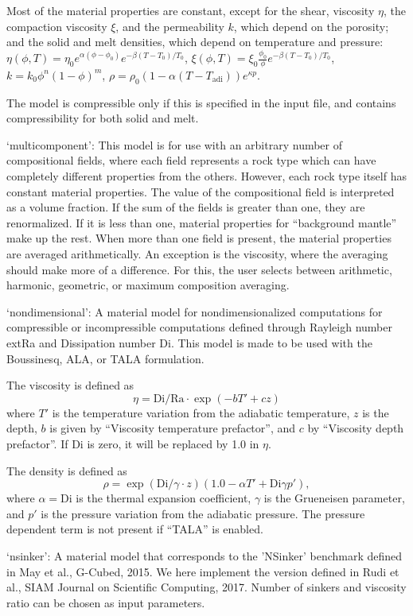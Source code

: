 \begin{itemize}
Most of the material properties are constant, except for the shear, viscosity $\eta$, the compaction viscosity $\xi$, and the permeability $k$, which depend on the porosity; and the solid and melt densities, which depend on temperature and pressure:
 $\eta(\phi,T) = \eta_0 e^{\alpha(\phi-\phi_0)} e^{-\beta(T-T_0)/T_0}$, $\xi(\phi,T) = \xi_0 \frac{\phi_0}{\phi} e^{-\beta(T-T_0)/T_0}$, $k=k_0 \phi^n (1-\phi)^m$, $\rho=\rho_0 (1 - \alpha (T - T_{\text{adi}})) e^{\kappa p}$.

The model is compressible only if this is specified in the input file, and contains compressibility for both solid and melt.

`multicomponent': This model is for use with an arbitrary number of compositional fields, where each field represents a rock type which can have completely different properties from the others. However, each rock type itself has constant material properties.  The value of the  compositional field is interpreted as a volume fraction. If the sum of the fields is greater than one, they are renormalized.  If it is less than one, material properties  for ``background mantle'' make up the rest. When more than one field is present, the material properties are averaged arithmetically.  An exception is the viscosity, where the averaging should make more of a difference.  For this, the user selects between arithmetic, harmonic, geometric, or maximum composition averaging.

`nondimensional': A material model for nondimensionalized computations for compressible or incompressible computations defined through Rayleigh number 	ext{Ra} and Dissipation number Di. This model is made to be used with the Boussinesq, ALA, or TALA formulation.

The viscosity is defined as \[\eta = \text{Di} / \text{Ra} \cdot \exp(-b T' + c z)\] where $T'$ is the temperature variation from the adiabatic temperature, $z$ is the depth, $b$ is given by ``Viscosity temperature prefactor'', and $c$ by ``Viscosity depth prefactor''. If $\text{Di}$ is zero, it will be replaced by 1.0 in $\eta$.

The density is defined as \[\rho = \exp(\text{Di}/\gamma \cdot z)  (1.0 - \alpha T' + \text{Di} \gamma p'),\] where $\alpha=\text{Di}$ is the thermal expansion coefficient, $\gamma$ is the Grueneisen parameter, and $p'$ is the pressure variation from the adiabatic pressure. The pressure dependent term is not present if ``TALA'' is enabled.

`nsinker': A material model that corresponds to the 'NSinker' benchmark defined in May et al., G-Cubed, 2015. We here implement the version defined in Rudi et al., SIAM Journal on Scientific Computing, 2017. Number of sinkers and viscosity ratio can be chosen as input parameters.


\end{itemize}
